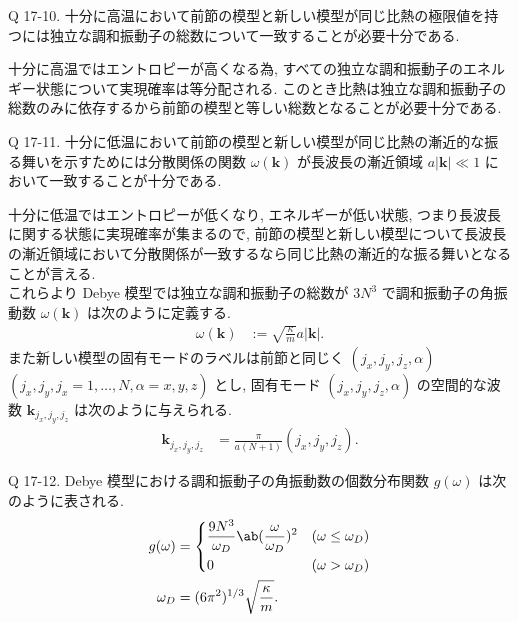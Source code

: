 \documentclass[uplatex,diffipdfmx,a4paper,11pt]{jlreq}
\theoremstyle{definition}
\begin{document}
\begin{itembox}[l]{Q 17-10.}
  十分に高温において前節の模型と新しい模型が同じ比熱の極限値を持つには独立な調和振動子の総数について一致することが必要十分である.
\end{itembox}

十分に高温ではエントロピーが高くなる為, すべての独立な調和振動子のエネルギー状態について実現確率は等分配される. このとき比熱は独立な調和振動子の総数のみに依存するから前節の模型と等しい総数となることが必要十分である.

\begin{itembox}[l]{Q 17-11.}
  十分に低温において前節の模型と新しい模型が同じ比熱の漸近的な振る舞いを示すためには分散関係の関数 $\omega(\bm{k})$ が長波長の漸近領域 $a|\bm{k}| \ll 1$ において一致することが十分である.
\end{itembox}

十分に低温ではエントロピーが低くなり, エネルギーが低い状態, つまり長波長に関する状態に実現確率が集まるので, 前節の模型と新しい模型について長波長の漸近領域において分散関係が一致するなら同じ比熱の漸近的な振る舞いとなることが言える. \\

これらより Debye 模型では独立な調和振動子の総数が $3N^3$ で調和振動子の角振動数 $\omega(\bm{k})$ は次のように定義する.
\begin{align}
  \omega(\bm{k}) & := \sqrt{\frac{\kappa}{m}}a|\bm{k}|.
\end{align}
また新しい模型の固有モードのラベルは前節と同じく $(j_x, j_y, j_z, \alpha)$ $(j_x,j_y,j_x=1,\ldots,N,\alpha=x,y,z)$ とし, 固有モード $(j_x, j_y, j_z, \alpha)$ の空間的な波数 $\bm{k}_{j_x,j_y,j_z}$ は次のように与えられる.
\begin{align}
  \bm{k}_{j_x,j_y,j_z} & = \frac{\pi}{a(N+1)}(j_x,j_y,j_z).
\end{align}

\begin{itembox}[l]{Q 17-12.}
  Debye 模型における調和振動子の角振動数の個数分布関数 $g(\omega)$ は次のように表される.
  \begin{align}
    g(\omega) & = \begin{dcases}
                    \frac{9N^3}{\omega_D}\ab(\frac{\omega}{\omega_D})^2 & (\omega\leq\omega_D) \\
                    0                                                   & (\omega > \omega_D)
                  \end{dcases} \\
    \omega_D  & = (6\pi^2)^{1/3}\sqrt{\frac{\kappa}{m}}.
  \end{align}
\end{itembox}
\end{document}
